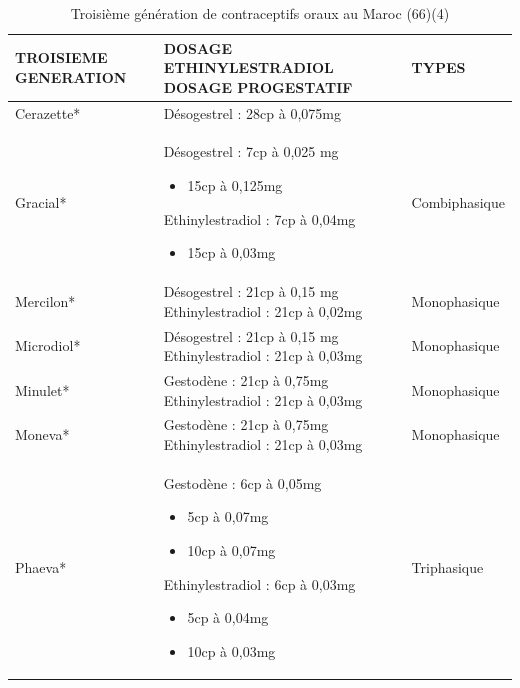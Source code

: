 \begin{table}[H]
  \centering
  \renewcommand{\arraystretch}{1.5}
  \begin{spacing}{1.35} %
  \begin{tabularx}{\textwidth}{|X|p{8cm}|X|}
      \hline
      \textbf{TROISIEME   \newline GENERATION} & \textbf{DOSAGE ETHINYLESTRADIOL \newline DOSAGE PROGESTATIF} & \textbf{TYPES}  \\
      \hline
      Cerazette* & Désogestrel : 28cp à 0,075mg
     &  \\
      \hline
      Gracial* & Désogestrel : 7cp à 0,025 mg 
      \begin{itemize}[label={}, nosep]
        \item \hspace{22mm}15cp à 0,125mg
      \end{itemize}
      Ethinylestradiol : 7cp à 0,04mg
      \begin{itemize}[label={}, nosep]
        \item \hspace{22mm}15cp à 0,03mg 
      \end{itemize}
& Combiphasique \\
\hline
Mercilon* & Désogestrel : 21cp à 0,15 mg 
\newline
Ethinylestradiol : 21cp à 0,02mg
& Monophasique \\  
\hline
Microdiol* & Désogestrel : 21cp à 0,15 mg   
\newline
Ethinylestradiol : 21cp à 0,03mg  
& Monophasique \\
\hline
Minulet* &Gestodène : 21cp à 0,75mg  
\newline
Ethinylestradiol : 21cp à 0,03mg  
& Monophasique \\
\hline
Moneva* & Gestodène : 21cp à 0,75mg   
\newline
Ethinylestradiol : 21cp à 0,03mg 
& Monophasique \\
\hline
Phaeva* & Gestodène : 6cp à 0,05mg 
\begin{itemize}[label={}, nosep]
  \item \hspace{22mm}5cp à 0,07mg  
  \item \hspace{22mm}10cp à 0,07mg  
\end{itemize} 
Ethinylestradiol : 6cp à 0,03mg
\begin{itemize}[label={}, nosep]
  \item \hspace{22mm}5cp à 0,04mg   
  \item \hspace{22mm}10cp à 0,03mg   
\end{itemize}
\vspace{1em}
& Triphasique \\
      \hline
  \end{tabularx}
\end{spacing}
  \caption{Troisième génération de contraceptifs oraux au Maroc (66)(4)}
\end{table}



